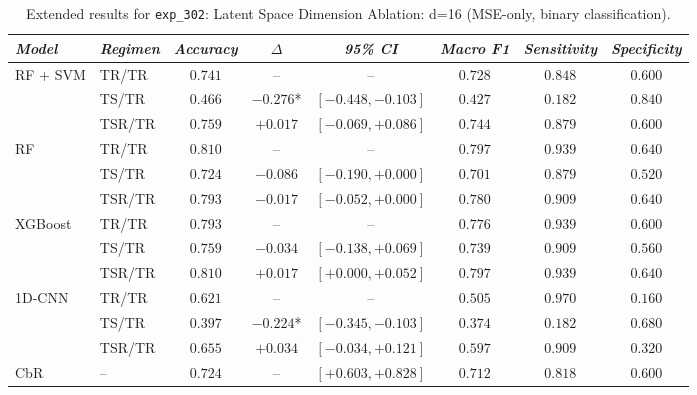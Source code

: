 \begin{table}[H]
\centering
\scriptsize
\caption{Extended results for \texttt{exp\_302}: Latent Space Dimension Ablation: d=16 (MSE-only, binary classification).}
\label{tab:appendix_exp_302}
\begin{tabular*}{\textwidth}{@{\extracolsep{\fill}}llcccccc}
\toprule
\emph{Model} & \emph{Regimen} & \emph{Accuracy} & \emph{$\Delta$} & \emph{95\% CI} & \emph{Macro F1} & \emph{Sensitivity} & \emph{Specificity}\\
\midrule
\multirow{3}{*}{RF + SVM} & TR/TR & $0.741$ & -- & -- & $0.728$ & $0.848$ & $0.600$\\
 & TS/TR & $0.466$ & $-0.276$* & $[-0.448, -0.103]$ & $0.427$ & $0.182$ & $0.840$\\
 & TSR/TR & $0.759$ & $+0.017$ & $[-0.069, +0.086]$ & $0.744$ & $0.879$ & $0.600$\\
\midrule
\multirow{3}{*}{RF} & TR/TR & $0.810$ & -- & -- & $0.797$ & $0.939$ & $0.640$\\
 & TS/TR & $0.724$ & $-0.086$ & $[-0.190, +0.000]$ & $0.701$ & $0.879$ & $0.520$\\
 & TSR/TR & $0.793$ & $-0.017$ & $[-0.052, +0.000]$ & $0.780$ & $0.909$ & $0.640$\\
\midrule
\multirow{3}{*}{XGBoost} & TR/TR & $0.793$ & -- & -- & $0.776$ & $0.939$ & $0.600$\\
 & TS/TR & $0.759$ & $-0.034$ & $[-0.138, +0.069]$ & $0.739$ & $0.909$ & $0.560$\\
 & TSR/TR & $0.810$ & $+0.017$ & $[+0.000, +0.052]$ & $0.797$ & $0.939$ & $0.640$\\
\midrule
\multirow{3}{*}{1D-CNN} & TR/TR & $0.621$ & -- & -- & $0.505$ & $0.970$ & $0.160$\\
 & TS/TR & $0.397$ & $-0.224$* & $[-0.345, -0.103]$ & $0.374$ & $0.182$ & $0.680$\\
 & TSR/TR & $0.655$ & $+0.034$ & $[-0.034, +0.121]$ & $0.597$ & $0.909$ & $0.320$\\
\midrule
CbR & -- & $0.724$ & -- & $[+0.603, +0.828]$ & $0.712$ & $0.818$ & $0.600$\\
\bottomrule
\end{tabular*}
\end{table}

